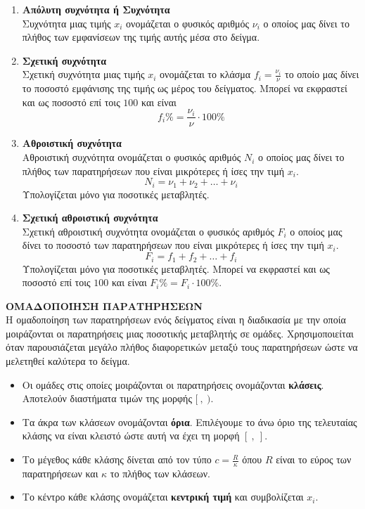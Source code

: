 \documentclass[twoside,11pt,a4paper,openany]{book}
\def\xrwma{red!70!black}
\newcounter{orismos}[chapter]
\renewcommand{\theorismos}{\arabic{orismos}}
\newcommand{\Orismos}[1]{\refstepcounter{orismos}{\textbf{\textbf{\textcolor{\xrwma}{{\large Ορισμός\hspace{2mm}\thechapter.\theorismos\;}:\;}}}}\hspace{1mm} \MakeUppercase{\textbf{#1}\\}}{}
\begin{document}
\begin{enumerate}[label=\bf\arabic*.,itemsep=0mm]
\item \textbf{Απόλυτη συχνότητα ή Συχνότητα}\\
Συχνότητα μιας τιμής $ x_i $ ονομάζεται ο φυσικός αριθμός $ \nu_i $ ο οποίος μας δίνει το πλήθος των εμφανίσεων της τιμής αυτής μέσα στο δείγμα.
\item \textbf{Σχετική συχνότητα}\\
Σχετική συχνότητα μιας τιμής $ x_i $ ονομάζεται το κλάσμα $ f_i=\frac{\nu_i}{\nu} $ το οποίο μας δίνει το ποσοστό εμφάνισης της τιμής ως μέρος του δείγματος. Μπορεί να εκφραστεί και ως ποσοστό επί τοις $ 100 $ και είναι \[ f_i\%=\frac{\nu_i}{\nu}\cdot 100\% \]
\item \textbf{Αθροιστική συχνότητα}\\
Αθροιστική συχνότητα ονομάζεται ο φυσικός αριθμός $ N_i $ ο οποίος μας δίνει το πλήθος των παρατηρήσεων που είναι μικρότερες ή ίσες την τιμή $ x_i $.
\[ N_i=\nu_1+\nu_2+\ldots+\nu_i \]
Υπολογίζεται μόνο για ποσοτικές μεταβλητές.
\item \textbf{Σχετική αθροιστική συχνότητα}\\
Σχετική αθροιστική συχνότητα ονομάζεται ο φυσικός αριθμός $ F_i $ ο οποίος μας δίνει το ποσοστό των παρατηρήσεων που είναι μικρότερες ή ίσες την τιμή $ x_i $.
\[ F_i=f_1+f_2+\ldots+f_i \]
Υπολογίζεται μόνο για ποσοτικές μεταβλητές. Μπορεί να εκφραστεί και ως ποσοστό επί τοις $ 100 $ και είναι $ F_i\%=F_i\cdot 100\% $.
\end{enumerate}
\Orismos{Ομαδοποίηση παρατηρήσεων}
Η ομαδοποίηση των παρατηρήσεων ενός δείγματος είναι η διαδικασία με την οποία μοιράζονται οι παρατηρήσεις μιας ποσοτικής μεταβλητής σε ομάδες. Χρησιμοποιείται όταν παρουσιάζεται μεγάλο πλήθος διαφορετικών μεταξύ τους παρατηρήσεων ώστε να μελετηθεί καλύτερα το δείγμα.
\begin{itemize}
\item Οι ομάδες στις οποίες μοιράζονται οι παρατηρήσεις ονομάζονται \textbf{κλάσεις}. Αποτελούν διαστήματα τιμών της μορφής $ [\ ,\ ) $.
\item Τα άκρα των κλάσεων ονομάζονται \textbf{όρια}. Επιλέγουμε το άνω όριο της τελευταίας κλάσης να είναι κλειστό ώστε αυτή να έχει τη μορφή $ [\ ,\ ] $.
\item Το μέγεθος κάθε κλάσης δίνεται από τον τύπο $ c=\frac{R}{\kappa} $ όπου $ R $ είναι το εύρος των παρατηρήσεων και $ \kappa $ το πλήθος των κλάσεων.
\item Το κέντρο κάθε κλάσης ονομάζεται \textbf{κεντρική τιμή} και συμβολίζεται $ x_i $.
\end{itemize}
\end{document}
